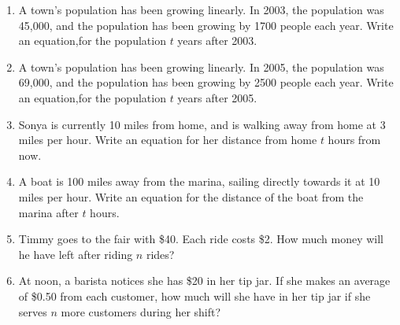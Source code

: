 \begin{enumerate}

\item A town's population has been growing linearly. In 2003, the population was 45,000, and the population has been growing by 1700 people each year. Write an equation,for the population $t$ years after 2003.

\item A town's population has been growing linearly. In 2005, the population was 69,000, and the population has been growing by 2500 people each year. Write an equation,for the population $t$ years after 2005.

\item Sonya is currently 10 miles from home, and is walking away from home at 3 miles per hour. Write an equation for her distance from home $t$ hours from now.

\item A boat is 100 miles away from the marina, sailing directly towards it at 10 miles per hour. Write an equation for the distance of the boat from the marina after $t$ hours.

\item Timmy goes to the fair with \$40. Each ride costs \$2. How much money will he have left after riding $n$ rides?

\item At noon, a barista notices she has \$20 in her tip jar. If she makes an average of \$0.50 from each customer, how much will she have in her tip jar if she serves $n$ more customers during her shift?



\end{enumerate}
